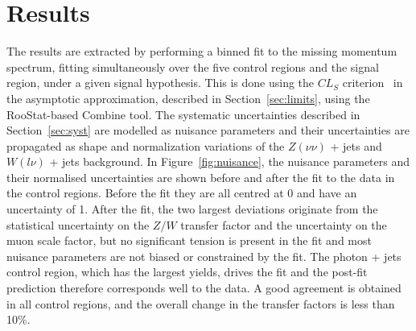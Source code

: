 \section{Results}
\label{sec:results}

The results are extracted by performing a binned fit to the missing momentum spectrum, fitting simultaneously over the five control regions and the signal region, under a given signal hypothesis. This is done using the $CL_S$ criterion~\cite{CLS1,CLS2} in the asymptotic approximation, described in Section~\ref{sec:limits}, using the RooStat-based Combine tool. The systematic uncertainties described in Section~\ref{sec:syst} are modelled as nuisance parameters and their uncertainties are propagated as shape and normalization variations of the $Z(\nu\nu)$ + jets and $W(l\nu)$ + jets background. In Figure~\ref{fig:nuisance}, the nuisance parameters and their normalised uncertainties are shown before and after the fit to the data in the control regions. Before the fit they are all centred at 0 and have an uncertainty of 1. After the fit, the two largest deviations originate from the statistical uncertainty on the $Z/W$ transfer factor and the uncertainty on the muon scale factor, but no significant tension is present in the fit and most nuisance parameters are not biased or constrained by the fit.
The photon + jets control region, which has the largest yields, drives the fit and the post-fit prediction therefore corresponds well to the data. A good agreement is obtained in all control regions, and the overall change in the transfer factors is less than 10\%.

